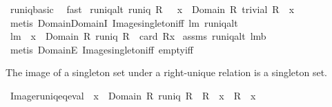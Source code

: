 \begin{isabellebody}
\isatagproof
{}\isamarkupfalse%
\ runiq{\isacharunderscore}basic\ \isamarkupfalse%
\ fast%
\endisatagproof
{\isafoldproof}%
%
\isadelimproof
%
\endisadelimproof
\isanewline
\isanewline
{}\isamarkupfalse%
\ runiq{\isacharunderscore}alt{}{\isacharcolon}\ {\isachardoublequoteopen}runiq\ R\ {\isacharequal}\ {\isacharparenleft}{\isasymforall}\ x\ {\isasymin}\ Domain\ R{\isachardot}\ trivial\ {\isacharparenleft}R\ {\isacharbackquote}{\isacharbackquote}\ {\isacharbraceleft}x{\isacharbraceright}{\isacharparenright}{\isacharparenright}{\isachardoublequoteclose}\ \isanewline
%
\isadelimproof
%
\endisadelimproof
%
\isatagproof
{}\isamarkupfalse%
\ {\isacharparenleft}metis\ Domain{\isachardot}DomainI\ Image{\isacharunderscore}singleton{\isacharunderscore}iff\ lm{}{}\ runiq{\isacharunderscore}alt{\isacharparenright}%
\endisatagproof
{\isafoldproof}%
%
\isadelimproof
\isanewline
%
\endisadelimproof
\isanewline
{}\isamarkupfalse%
\ lm{}{}{}{\isacharcolon}\ \ {\isachardoublequoteopen}x\ {\isasymin}\ Domain\ R{\isachardoublequoteclose}\ {\isachardoublequoteopen}runiq\ R{\isachardoublequoteclose}\ \ {\isachardoublequoteopen}card\ {\isacharparenleft}R{\isacharbackquote}{\isacharbackquote}{\isacharbraceleft}x{\isacharbraceright}{\isacharparenright}{\isacharequal}{}{\isachardoublequoteclose}\isanewline
%
\isadelimproof
%
\endisadelimproof
%
\isatagproof
{}\isamarkupfalse%
\ assms\ runiq{\isacharunderscore}alt{}\ lm{}{}{}b\ \isamarkupfalse%
\ {\isacharparenleft}metis\ DomainE\ Image{\isacharunderscore}singleton{\isacharunderscore}iff\ empty{\isacharunderscore}iff{\isacharparenright}%
\endisatagproof
{\isafoldproof}%
%
\isadelimproof
%
\endisadelimproof
%
\begin{isamarkuptext}%
The image of a singleton set under a right-unique relation is a singleton set.%
\end{isamarkuptext}%
\isamarkuptrue%
\isamarkupfalse%
\ Image{\isacharunderscore}runiq{\isacharunderscore}eq{\isacharunderscore}eval{\isacharcolon}\ \ {\isachardoublequoteopen}x\ {\isasymin}\ Domain\ R{\isachardoublequoteclose}\ {\isachardoublequoteopen}runiq\ R{\isachardoublequoteclose}\ \ {\isachardoublequoteopen}R\ {\isacharbackquote}{\isacharbackquote}\ {\isacharbraceleft}x{\isacharbraceright}\ {\isacharequal}\ {\isacharbraceleft}R\ {\isacharcomma}{\isacharcomma}\ x{\isacharbraceright}{\isachardoublequoteclose}\ \isanewline

\end{isabellebody}
